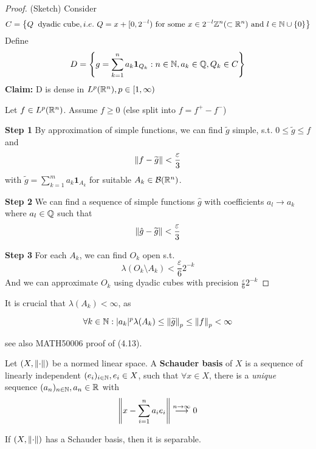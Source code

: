 \documentclass{article}
\begin{document}
\begin{proof}
	(Sketch)  Consider
	$$
		C = \left\{Q\: \text{\ dyadic\ cube}, i.e. \ Q = x + [0, 2^{-l}) \text{\ for\ some\ } x \in 2^{-l} \inte^n(\subset \real^n) \text{\ and\ } l\in \natu \cup \{0\}\right\}
	$$
	Define
	$$
		D = \left\{g = \sum_{k=1}^n a_k \mathbf{1}_{Q_k}: n\in \mathbb{N}, a_k \in \mathbb{Q}, Q_k \in C \right\}
	$$
	\textbf{Claim:} D is dense in $L^p(\mathbb{R}^n), p \in [1, \infty)$

	Let $f \in L^p(\mathbb{R}^n)$. Assume $f \geq 0$ (else split into $f=f^+-f^-$)

	\textbf{Step 1} By approximation of simple functions, we can find $\widetilde{g}$ simple, s.t. $0 \leq \widetilde{g} \leq f$ and
	$$
		\left\|{f-\widetilde{g}}\right\| < \frac{\varepsilon}{3}
	$$
	with $\widetilde{g}=\sum_{k=1}^m a_k \mathbf{1}_{A_k}$ for suitable $A_k \in \mathcal{B}(\mathbb{R}^n)$.

	\textbf{Step 2} We can find a sequence of simple functions $\hat{g}$ with coefficients $a_l \to a_k$ where $a_l\in \mathbb{Q}$ such that
	$$
		\left\|{\hat{g}-\widetilde{g}}\right\| < \frac{\varepsilon}{3}
	$$

	\textbf{Step 3} For each $A_k$, we can find $O_k$ open s.t.
	$$
		\lambda(O_k\setminus A_k) < \frac{\varepsilon}{6} 2^{-k}
	$$
	And we can approximate $O_k$ using dyadic cubes with precision $\frac{\varepsilon}{6} 2^{-k}$
\end{proof}

It is crucial that $\lambda(A_k) < \infty$, as

$$
	\forall k \in \mathbb{N}: |a_k|^p \lambda(A_k) \leq \left\|{\widetilde{g}}\right\|_p \leq \left\|{f}\right\|_p < \infty
$$

see also MATH50006 proof of (4.13).

\begin{definition}

	Let $(X,\left\|{\cdot}\right\|)$ be a normed linear space. A \textbf{Schauder basis} of $X$ is a sequence of linearly independent $(e_i)_{i\in \mathbb{N}}, e_i \in X$, such that $\forall x \in X$,  there is a \textit{unique} sequence $(a_n)_{n\in \mathbb{N}}, a_n \in \mathbb{R}$ with
	$$
		\left\|{x - \sum_{i=1}^n a_i e_i}\right\| \overset{n\to \infty}{\longrightarrow} 0
	$$
\end{definition}


\begin{proposition}
	\label{Schauder implies separability}
	If $(X, \left\|{\cdot}\right\|)$ has a Schauder basis, then it is separable.
\end{proposition}
\end{document}
